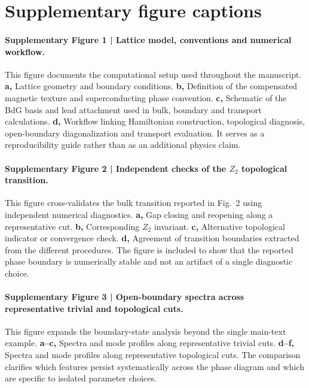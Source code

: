 \documentclass[11pt]{article}
\begin{document}
\section*{Supplementary figure captions}

\paragraph{Supplementary Figure 1 | Lattice model, conventions and numerical workflow.}
This figure documents the computational setup used throughout the manuscript. \textbf{a,} Lattice geometry and boundary conditions. \textbf{b,} Definition of the compensated magnetic texture and superconducting phase convention. \textbf{c,} Schematic of the BdG basis and lead attachment used in bulk, boundary and transport calculations. \textbf{d,} Workflow linking Hamiltonian construction, topological diagnosis, open-boundary diagonalization and transport evaluation. It serves as a reproducibility guide rather than as an additional physics claim.

\paragraph{Supplementary Figure 2 | Independent checks of the $Z_2$ topological transition.}
This figure cross-validates the bulk transition reported in Fig.~2 using independent numerical diagnostics. \textbf{a,} Gap closing and reopening along a representative cut. \textbf{b,} Corresponding $Z_2$ invariant. \textbf{c,} Alternative topological indicator or convergence check. \textbf{d,} Agreement of transition boundaries extracted from the different procedures. The figure is included to show that the reported phase boundary is numerically stable and not an artifact of a single diagnostic choice.

\paragraph{Supplementary Figure 3 | Open-boundary spectra across representative trivial and topological cuts.}
This figure expands the boundary-state analysis beyond the single main-text example. \textbf{a--c,} Spectra and mode profiles along representative trivial cuts. \textbf{d--f,} Spectra and mode profiles along representative topological cuts. The comparison clarifies which features persist systematically across the phase diagram and which are specific to isolated parameter choices.
\end{document}
